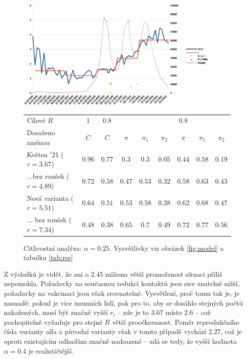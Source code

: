 \begin{figure}
\begin{center}
\includegraphics[width=10cm]{pic/whole4}
						 

\begin{tabular}{l|c|c|ccc|ccc}									
Cílové $R$	& $1$	& $0.8$	&	&	&	& $0.8$	&	&	\\ 
Dosaženo změnou	& $C$	& $C$	& $\pi$	& $\pi_1$	& $\pi_2$	& $\pi$	& $\pi_1$	& $\pi_2$	\\ \hline
Květen '21 ($r=3.67$)	& $0.96$	& $0.77$	& $0.3$	& $0.3$	& $0.05$	& $0.44$	& $0.58$	& $0.19$	\\
...bez roušek ($r=4.89$)	& $0.72$	& $0.58$	& $0.47$	& $0.53$	& $0.32$	& $0.58$	& $0.63$	& $0.43$	\\
Nová varianta ($r=5.51$)	& $0.64$	& $0.51$	& $0.53$	& $0.58$	& $0.38$	& $0.62$	& $0.68$	& $0.47$	\\
... bez roušek ($r=7.34$)	& $0.48$	& $0.38$	& $0.65$	& $0.7$	& $0.49$	& $0.72$	& $0.77$	& $0.56$	
\end{tabular}									


\caption{Citlivostní analýza: $\alpha=0.25$. Vysvětlivky viz obrázek \ref{fig:model} a tabulku \ref{tab:res}}
\label{fig:calpha}
\end{center}
\end{figure}
Z výsledků je vidět, že ani o 2.45 milionu větší promořenost situaci příliš
nepomohla. Požadavky na současnou redukci kontaktů jsou sice znatelně
nižší, požadavky na vakcinaci jsou však srovnatelné. Vysvětlení, proč
tomu tak je, je nasnadě: pokud je více imunních lidí, pak pro to,
aby se dosáhlo stejných počtů nakažených, musí být značně vyšší $r_{t}$
-- zde je to 3.67 místo 2.6 -- což pochopitelně vyžaduje pro stejné $R$
větší proočkovanost. Poměr reprodukčního čísla varianty alfa a
původní varianty však v tomto případě vychází 2.27, což je oproti
existujícím odhadům značně nadsazené -- zdá se tedy, že vyšší hodnota
$\alpha=0.4$ je realističtější.

